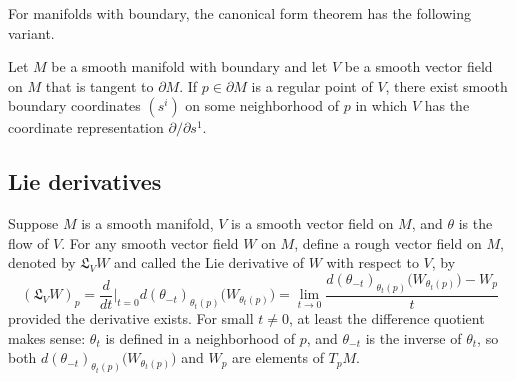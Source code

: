 For manifolds with boundary, the canonical form theorem has the following
variant.
\begin{theorem}
Let $M$ be a smooth manifold with boundary and let $V$ be a smooth vector field on $M$ that is tangent to $\partial M$. If $p\in\partial M$ is a regular point of $V$, there exist smooth boundary coordinates $(s^i)$ on some neighborhood of $p$ in which $V$ has the coordinate representation $\partial/\partial s^1$.
\end{theorem}
\subsection{Lie derivatives}
Suppose $M$ is a smooth manifold, $V$ is a smooth vector field on $M$, and $\theta$ is the flow of $V$. For any smooth vector field $W$ on $M$, define a rough vector field on $M$, denoted by $\mathfrak{L}_VW$ and called the Lie derivative of $W$ with respect to $V$, by
\[(\mathfrak{L}_VW)_p=\frac{d}{dt}\Big|_{t=0}d(\theta_{-t})_{\theta_t(p)}\big(W_{\theta_t(p)}\big)=\lim_{t\to 0}\frac{d(\theta_{-t})_{\theta_t(p)}\big(W_{\theta_t(p)}\big)-W_p}{t}\]
provided the derivative exists. For small $t\neq 0$, at least the difference quotient makes sense: $\theta_t$ is defined in a neighborhood of $p$, and $\theta_{-t}$ is the inverse of $\theta_t$, so both $d(\theta_{-t})_{\theta_t(p)}\big(W_{\theta_t(p)}\big)$ and $W_p$ are elements of $T_pM$.
